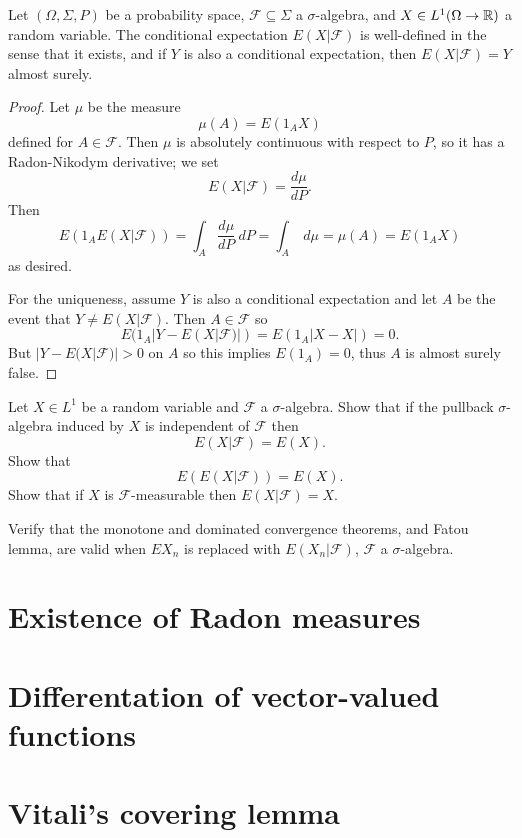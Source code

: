 \begin{corollary}
Let $(\Omega, \Sigma, P)$ be a probability space, $\mathcal F \subseteq \Sigma$ a $\sigma$-algebra, and $X \in L^1(\Omega \to \mathbb{R})$ a random variable.
The conditional expectation $E(X|\mathcal F)$ is well-defined in the sense that it exists, and if $Y$ is also a conditional expectation, then $E(X|\mathcal F) = Y$ almost surely.
\end{corollary}
\begin{proof}
Let $\mu$ be the measure
\[\mu(A) = E(1_A X)\]
defined for $A \in \mathcal F$.
Then $\mu$ is absolutely continuous with respect to $P$, so it has a Radon-Nikodym derivative; we set
\[E(X|\mathcal F) = \frac{d\mu}{dP}.\]
Then
\[E(1_A E(X|\mathcal F)) = \int_A \frac{d\mu}{dP} ~dP = \int_A ~d\mu = \mu(A) = E(1_A X)\]
as desired.

For the uniqueness, assume $Y$ is also a conditional expectation and let $A$ be the event that $Y \neq E(X|\mathcal F)$.
Then $A \in \mathcal F$ so
\[E(1_A|Y - E(X|\mathcal F)|) = E(1_A|X - X|) = 0.\]
But $|Y - E(X|\mathcal F)| > 0$ on $A$ so this implies $E(1_A) = 0$, thus $A$ is almost surely false.
\end{proof}

\begin{exercise}
Let $X \in L^1$ be a random variable and $\mathcal F$ a $\sigma$-algebra. Show that if the pullback $\sigma$-algebra induced by $X$ is independent of $\mathcal F$ then
\[E(X|\mathcal F) = E(X).\]
Show that
\[E(E(X|\mathcal F)) = E(X).\]
Show that if $X$ is $\mathcal F$-measurable then $E(X|\mathcal F) = X$.
\end{exercise}

\begin{exercise}
Verify that the monotone and dominated convergence theorems, and Fatou lemma, are valid when $EX_n$ is replaced with $E(X_n|\mathcal F)$, $\mathcal F$ a $\sigma$-algebra.
\end{exercise}

\section{Existence of Radon measures}

\section{Differentation of vector-valued functions}

\section{Vitali's covering lemma}

